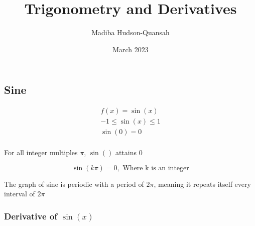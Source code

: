\documentclass[12pt letter]{report}
\title{\Huge{Trigonometry and Derivatives}}
\author{\huge{Madiba Hudson-Quansah}}
\date{March 2023}
\begin{document}
\maketitle
\newpage
{}
\tableofcontents
\pagebreak

\chapter{}
\section{Sine}

\begin{align*}
	f(x) = \sin(x)                \\
	-1 \leq        \sin(x) \leq 1 \\
	\sin(0) = 0                   \\
\end{align*}

For all integer multiples $\pi $, $\sin()$ attains 0

\[
	\sin(k\pi) = 0,  \text{ Where k is an integer}
\]

The graph of sine is periodic with a period of $2\pi$, meaning it repeats itself every interval of $2\pi$

\subsection{Derivative of $\sin(x)$}

\end{document}
